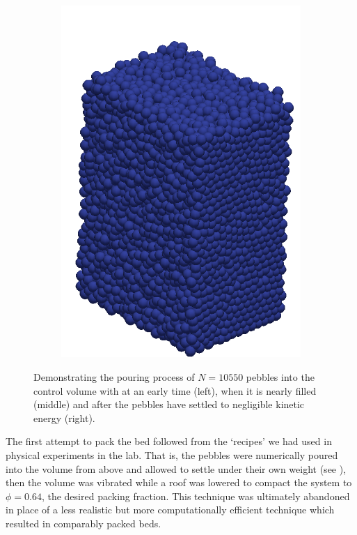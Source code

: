 \begin{figure}[!ht]
\begin{subfigure}[b]{0.25\textwidth}
        \includegraphics[width=\textwidth]{figures/fill03.png}
    \end{subfigure}
    \caption{Demonstrating the pouring process of $N = 10550$ pebbles into the control volume with at an early time (left), when it is nearly filled (middle) and after the pebbles have settled to negligible kinetic energy (right).}
\label{fig:fill01}
\end{figure}

The first attempt to pack the bed followed from the `recipes' we had used in physical experiments in the lab. That is, the pebbles were numerically poured into the volume from above and allowed to settle under their own weight (see ), then the volume was vibrated while a roof was lowered to compact the system to $\phi = 0.64$, the desired packing fraction. This technique was ultimately abandoned in place of a less realistic but more computationally efficient technique which resulted in comparably packed beds.

